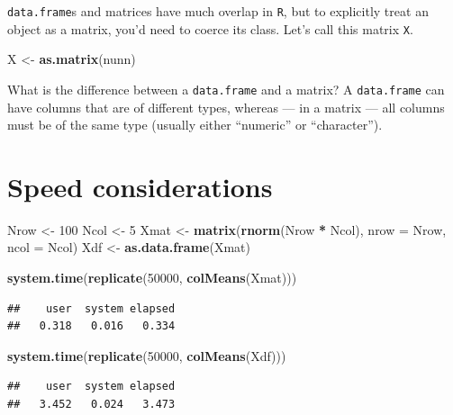 \documentclass[]{book}
\newenvironment{Shaded}{\begin{snugshade}}{\end{snugshade}}
\newcommand{\KeywordTok}[1]{\textcolor[rgb]{0.13,0.29,0.53}{\textbf{#1}}}
\newcommand{\DataTypeTok}[1]{\textcolor[rgb]{0.13,0.29,0.53}{#1}}
\newcommand{\DecValTok}[1]{\textcolor[rgb]{0.00,0.00,0.81}{#1}}
\newcommand{\StringTok}[1]{\textcolor[rgb]{0.31,0.60,0.02}{#1}}
\newcommand{\OperatorTok}[1]{\textcolor[rgb]{0.81,0.36,0.00}{\textbf{#1}}}
\newcommand{\NormalTok}[1]{#1}
\theoremstyle{definition}
\theoremstyle{definition}
\theoremstyle{definition}
\theoremstyle{remark}
\begin{document}
\texttt{data.frame}s and matrices have much overlap in \texttt{R}, but
to explicitly treat an object as a matrix, you'd need to coerce its
class. Let's call this matrix \texttt{X}.

\begin{Shaded}
\begin{Highlighting}[]
\NormalTok{X <-}\StringTok{ }\KeywordTok{as.matrix}\NormalTok{(nunn)}
\end{Highlighting}
\end{Shaded}

What is the difference between a \texttt{data.frame} and a matrix? A
\texttt{data.frame} can have columns that are of different types,
whereas --- in a matrix --- all columns must be of the same type
(usually either ``numeric'' or ``character'').

\section{Speed considerations}\label{speed-considerations}

\begin{Shaded}
\begin{Highlighting}[]
\NormalTok{Nrow <-}\StringTok{ }\DecValTok{100}
\NormalTok{Ncol <-}\StringTok{ }\DecValTok{5}
\NormalTok{Xmat <-}\StringTok{ }\KeywordTok{matrix}\NormalTok{(}\KeywordTok{rnorm}\NormalTok{(Nrow }\OperatorTok{*}\StringTok{ }\NormalTok{Ncol), }\DataTypeTok{nrow =}\NormalTok{ Nrow, }\DataTypeTok{ncol =}\NormalTok{ Ncol)}
\NormalTok{Xdf <-}\StringTok{ }\KeywordTok{as.data.frame}\NormalTok{(Xmat)}

\KeywordTok{system.time}\NormalTok{(}\KeywordTok{replicate}\NormalTok{(}\DecValTok{50000}\NormalTok{, }\KeywordTok{colMeans}\NormalTok{(Xmat)))}
\end{Highlighting}
\end{Shaded}

\begin{verbatim}
##    user  system elapsed 
##   0.318   0.016   0.334
\end{verbatim}

\begin{Shaded}
\begin{Highlighting}[]
\KeywordTok{system.time}\NormalTok{(}\KeywordTok{replicate}\NormalTok{(}\DecValTok{50000}\NormalTok{, }\KeywordTok{colMeans}\NormalTok{(Xdf)))}
\end{Highlighting}
\end{Shaded}

\begin{verbatim}
##    user  system elapsed 
##   3.452   0.024   3.473
\end{verbatim}
\end{document}
